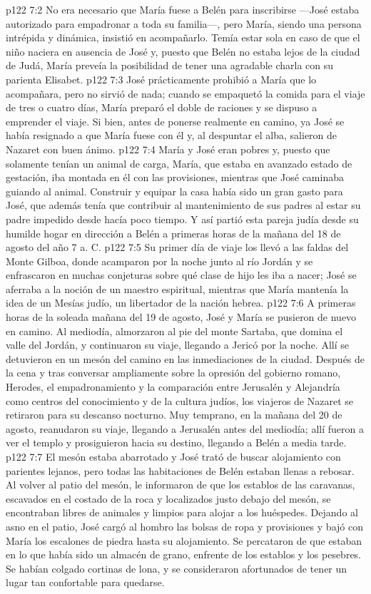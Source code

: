 \vs p122 7:2 No era necesario que María fuese a Belén para inscribirse ---José estaba autorizado para empadronar a toda su familia---, pero María, siendo una persona intrépida y dinámica, insistió en acompañarlo. Temía estar sola en caso de que el niño naciera en ausencia de José y, puesto que Belén no estaba lejos de la ciudad de Judá, María preveía la posibilidad de tener una agradable charla con su parienta Elisabet.
\vs p122 7:3 José prácticamente prohibió a María que lo acompañara, pero no sirvió de nada; cuando se empaquetó la comida para el viaje de tres o cuatro días, María preparó el doble de raciones y se dispuso a emprender el viaje. Si bien, antes de ponerse realmente en camino, ya José se había resignado a que María fuese con él y, al despuntar el alba, salieron de Nazaret con buen ánimo.
\vs p122 7:4 María y José eran pobres y, puesto que solamente tenían un animal de carga, María, que estaba en avanzado estado de gestación, iba montada en él con las provisiones, mientras que José caminaba guiando al animal. Construir y equipar la casa había sido un gran gasto para José, que además tenía que contribuir al mantenimiento de sus padres al estar su padre impedido desde hacía poco tiempo. Y así partió esta pareja judía desde su humilde hogar en dirección a Belén a primeras horas de la mañana del 18 de agosto del año 7 a. C.
\vs p122 7:5 Su primer día de viaje los llevó a las faldas del Monte Gilboa, donde acamparon por la noche junto al río Jordán y se enfrascaron en muchas conjeturas sobre qué clase de hijo les iba a nacer; José se aferraba a la noción de un maestro espiritual, mientras que María mantenía la idea de un Mesías judío, un libertador de la nación hebrea.
\vs p122 7:6 A primeras horas de la soleada mañana del 19 de agosto, José y María se pusieron de nuevo en camino. Al mediodía, almorzaron al pie del monte Sartaba, que domina el valle del Jordán, y continuaron su viaje, llegando a Jericó por la noche. Allí se detuvieron en un mesón del camino en las inmediaciones de la ciudad. Después de la cena y tras conversar ampliamente sobre la opresión del gobierno romano, Herodes, el empadronamiento y la comparación entre Jerusalén y Alejandría como centros del conocimiento y de la cultura judíos, los viajeros de Nazaret se retiraron para su descanso nocturno. Muy temprano, en la mañana del 20 de agosto, reanudaron su viaje, llegando a Jerusalén antes del mediodía; allí fueron a ver el templo y prosiguieron hacia su destino, llegando a Belén a media tarde.
\vs p122 7:7 El mesón estaba abarrotado y José trató de buscar alojamiento con parientes lejanos, pero todas las habitaciones de Belén estaban llenas a rebosar. Al volver al patio del mesón, le informaron de que los establos de las caravanas, escavados en el costado de la roca y localizados justo debajo del mesón, se encontraban libres de animales y limpios para alojar a los huéspedes. Dejando al asno en el patio, José cargó al hombro las bolsas de ropa y provisiones y bajó con María los escalones de piedra hasta su alojamiento. Se percataron de que estaban en lo que había sido un almacén de grano, enfrente de los establos y los pesebres. Se habían colgado cortinas de lona, y se consideraron afortunados de tener un lugar tan confortable para quedarse.
